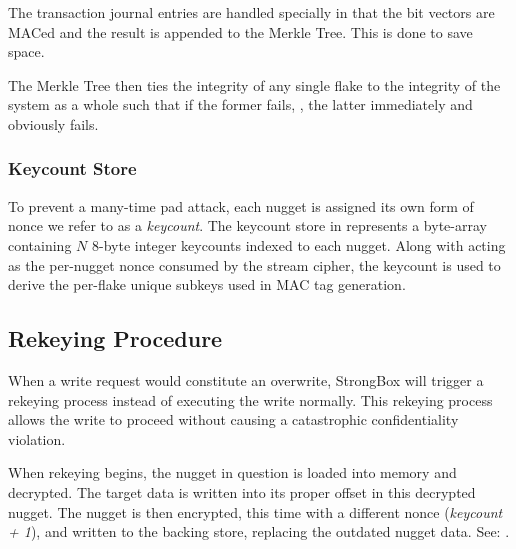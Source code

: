 The transaction journal entries are handled specially in that the bit
vectors are MACed and the result is appended to the Merkle Tree. This is done to
save space.

The Merkle Tree then ties the integrity of any single flake to the integrity of
the system as a whole such that if the former fails, , the latter immediately and obviously fails.

\subsubsection{Keycount Store}

To prevent a many-time pad attack, each nugget is assigned its own
form of nonce we refer to as a \emph{keycount}. The keycount store in
 represents a byte-array containing $N$ 8-byte
integer keycounts indexed to each nugget. Along with acting as the
per-nugget nonce consumed by the stream cipher, the keycount is used
to derive the per-flake unique subkeys used in MAC tag generation.

\subsection{Rekeying Procedure}

When a write request would constitute an overwrite, StrongBox will
trigger a rekeying process instead of executing the write normally.
This rekeying process allows the write to proceed without causing a
catastrophic confidentiality violation.

When rekeying begins, the nugget in question is loaded into memory and
decrypted. The target data is written into its proper offset in this decrypted
nugget. The nugget is then encrypted, this time with a different nonce
(\textit{keycount + 1}), and written to the backing store, replacing the
outdated nugget data. See: .


